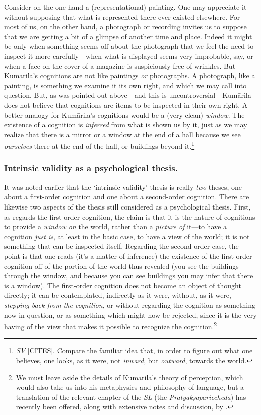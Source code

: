 ﻿\documentclass[11pt]{amsart}
\begin{document}
Consider on the one hand a (representational) painting. One may appreciate it without supposing that what is represented there ever existed elsewhere. For most of us, on the other hand, a photograph or recording invites us to suppose that we are getting a bit of a glimpse of another time and place. Indeed it might be only when something seems off about the photograph that we feel the need to inspect it more carefully---when what is displayed seems very improbable, say, or when a face on the cover of a magazine is suspiciously free of wrinkles. But Kum\=arila's cognitions are not like paintings \emph{or} photographs. A photograph, like a painting, is something we examine it its own right, and which we may call into question. But, as was pointed out above---and this is uncontroversial---Kum\=arila does not believe that cognitions are items to be inspected in their own right. A better analogy for Kum\=arila's cognitions would be a (very clean) \emph{window}. The existence of a cognition is \emph{inferred} from what is shown us by it, just as we may realize that there is a mirror or a window at the end of a hall because we see \emph{ourselves} there at the end of the hall, or buildings beyond it.\footnote{\emph{SV} [CITES]. Compare the familiar idea that, in order to figure out what one believes, one looks, as it were, not \emph{inward}, but \emph{outward}, towards the world.}

\subsubsection*{Intrinsic validity as a psychological thesis.} It was noted earlier that the `intrinsic validity' thesis is really \emph{two} theses, one about a first-order cognition and one about a second-order cognition. There are likewise two aspects of the thesis still considered as a psychological thesis. First, as regards the first-order cognition, the claim is that it is the nature of cognitions to provide a \emph{window on} the world, rather than a \emph{picture of} it---to have a cognition \emph{just is}, at least in the basic case, to have a view of the world; it is not something that can be inspected itself.  Regarding the second-order case, the point is that one reads (it's a matter of inference) the existence of the first-order cognition off of the portion of the world thus revealed (you see the buildings through the window, and because you can see buildings you may infer that there is a window). The first-order cognition does not become an object of thought directly; it can be contemplated, indirectly as it were, without, as it were, \emph{stepping back from the cognition}, or without regarding the cognition as something now in question, or as something which might now be rejected, since it is the very having of the view that makes it possible to recognize the cognition.\footnote{We must leave aside the details of Kum\=arila's theory of perception, which would also take us into his metaphysics and philosophy of language, but a translation of the relevant chapter of the \emph{SL} (the \emph{Pratyak\d sapariccheda}) has recently been offered, along with extensive notes and discussion, by \citet{taber2005hindu}.}
\end{document}
